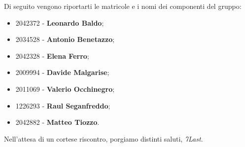 \documentclass[italian,12pt]{article} %
\begin{document}
\begin{flushleft}
    Di seguito vengono riportarti le matricole e i nomi dei componenti del gruppo:
    \begin{itemize}
        \item 2042372 - \textbf{Leonardo Baldo};
        \item 2034528 - \textbf{Antonio Benetazzo};
        \item 2042328 - \textbf{Elena Ferro};
        \item 2009994 - \textbf{Davide Malgarise};
        \item 2011069 - \textbf{Valerio Occhinegro};
        \item 1226293 - \textbf{Raul Seganfreddo};
        \item 2042882 - \textbf{Matteo Tiozzo}.
    \end{itemize}
    Nell'attesa di un cortese riscontro, porgiamo distinti saluti, \textit{7Last}.
\end{flushleft}
\end{document}
